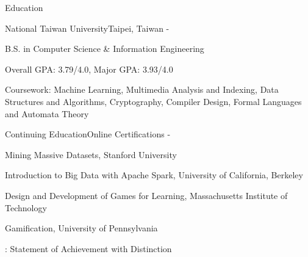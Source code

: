 \documentclass{cv}
\begin{document}
\begin{cvHeader} 
\end{cvHeader}


\begin{cvSection}{Education}

\begin{eduSubsection}{National Taiwan University}{Taipei, Taiwan}{ - }

\item B.S. in Computer Science \& Information Engineering
\item Overall GPA: 3.79/4.0, Major GPA: 3.93/4.0
\item Coursework: Machine Learning, Multimedia Analysis and Indexing, Data Structures and Algorithms, Cryptography, Compiler Design, Formal Languages and Automata Theory
\end{eduSubsection}

\begin{eduSubsection}{Continuing Education}{Online Certifications}{ - }
\item *Mining Massive Datasets, Stanford University %
\item Introduction to Big Data with Apache Spark, University of California, Berkeley %
\item Design and Development of Games for Learning, Massachusetts Institute of Technology %
\item Gamification, University of Pennsylvania %

\hfill {\footnotesize *: Statement of Achievement with Distinction}

\end{eduSubsection}

\end{cvSection}

\end{document}
